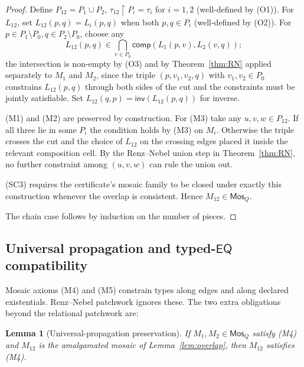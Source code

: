 \documentclass[11pt]{article}
\newtheorem{lemma}[theorem]{Lemma}
\newcommand{\EQ}{\mathsf{EQ}}
\newcommand{\Inv}{\mathsf{inv}}
\newcommand{\comp}{\mathsf{comp}}
\newcommand{\Mos}{\mathsf{Mos}}
\begin{document}
\begin{proof}
Define \(P_{12} = P_1 \cup P_2\),
\(\tau_{12} \restriction P_i = \tau_i\) for \(i = 1, 2\) (well-defined
by (O1)).  For \(L_{12}\), set
\(L_{12}(p, q) = L_i(p, q)\) when both \(p, q \in P_i\) (well-defined
by (O2)).  For \(p \in P_1 \setminus P_0, q \in P_2 \setminus P_0\),
choose any
\[
  L_{12}(p, q) \in \bigcap_{v \in P_0}
    \comp(L_1(p, v), L_2(v, q));
\]
the intersection is non-empty by (O3) and by Theorem~\ref{thm:RN}
applied separately to \(M_1\) and \(M_2\), since the triple
\((p, v_1, v_2, q)\) with \(v_1, v_2 \in P_0\) constrains
\(L_{12}(p, q)\) through both sides of the cut and the constraints
must be jointly satisfiable.  Set \(L_{12}(q, p) = \Inv(L_{12}(p, q))\)
for inverse.

(M1) and (M2) are preserved by construction.  For (M3) take any
\(u, v, w \in P_{12}\).  If all three lie in some \(P_i\) the
condition holds by (M3) on \(M_i\).  Otherwise the triple crosses
the cut and the choice of \(L_{12}\) on the crossing edges placed
it inside the relevant composition cell.  By
the Renz--Nebel union step in Theorem~\ref{thm:RN}, no further
constraint among \((u,v,w)\) can rule the union out.

(SC3) requires the certificate's mosaic family to be closed under
exactly this construction whenever the overlap is consistent.  Hence
\(M_{12} \in \Mos_Q\).

The chain case follows by induction on the number of pieces.
\end{proof}

\subsection{Universal propagation and typed-\(\EQ\) compatibility}

Mosaic axioms (M4) and (M5) constrain types along edges and along
declared existentials.  Renz--Nebel patchwork ignores these.  The
two extra obligations beyond the relational patchwork are:

\begin{lemma}[Universal-propagation preservation]\label{lem:M4-preserved}
If \(M_1, M_2 \in \Mos_Q\) satisfy (M4) and \(M_{12}\) is the
amalgamated mosaic of Lemma~\ref{lem:overlap}, then \(M_{12}\)
satisfies (M4).
\end{lemma}
\end{document}
